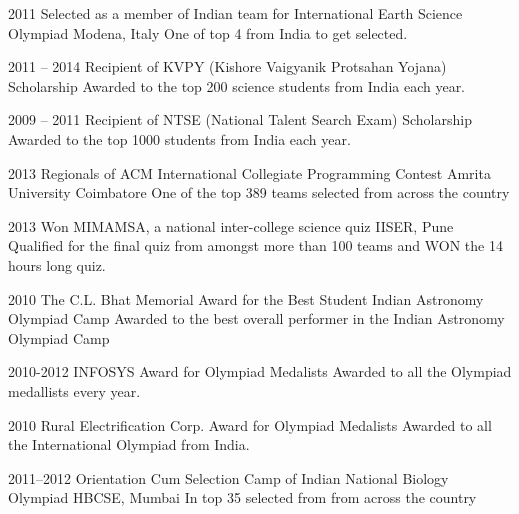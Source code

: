 \documentclass[11pt]{friggeri-cv}%
\begin{document}
\begin{entrylist}
  \entryy
    {2011}
    {Selected as a member of Indian team for International Earth Science Olympiad}
    {Modena, Italy}
    {One of top 4 from India to get selected.}
\end{entrylist}
\begin{entrylist}
  \entryy
    {2011 -- 2014}
    {Recipient of KVPY (Kishore Vaigyanik Protsahan Yojana) Scholarship}{}
    {Awarded to the top 200 science students from India each year.}

\end{entrylist}
\begin{entrylist}
  \entryy
    {2009 -- 2011}
    {Recipient of NTSE (National Talent Search Exam) Scholarship}{}
    {Awarded to the top 1000 students from India each year.}
\end{entrylist}
\begin{entrylist}
  \entryy
    {2013}
    {Regionals of ACM International Collegiate Programming Contest}
    {Amrita University Coimbatore}
    {One of the top 389 teams selected from across the country}
\end{entrylist}
\begin{entrylist}
  \entryy
    {2013}
    {Won MIMAMSA, a national inter-college science quiz}
    {IISER, Pune}
    {Qualified for the final quiz from amongst more than 100 teams and WON the 14 hours long quiz.}
\end{entrylist}
\begin{entrylist}
  \entryy
    {2010}
    {The C.L. Bhat Memorial Award for the Best Student}
    {Indian Astronomy Olympiad Camp}
    {Awarded to the best overall performer in the Indian Astronomy Olympiad Camp}
\end{entrylist}
\begin{entrylist}
  \entryy
    {2010-2012}
    {INFOSYS Award for Olympiad Medalists}
    {}
    {Awarded to all the Olympiad medallists every year.}
\end{entrylist}
\begin{entrylist}
  \entryy
    {2010}
    {Rural Electrification Corp. Award for Olympiad Medalists}
    {}
    {Awarded to all the International Olympiad from India.}
\end{entrylist}
\begin{entrylist}
  \entryy
    {2011--2012}
    {Orientation Cum Selection Camp of Indian National Biology Olympiad}
    {HBCSE, Mumbai}
    {In top 35 selected from  from across the country}

\end{entrylist}
\end{document}
